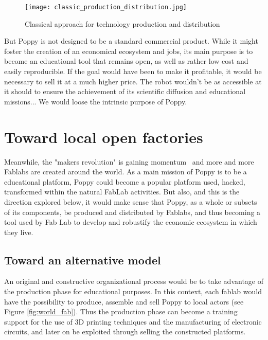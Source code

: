 \begin{figure}[h]
    \begin{center}
        \texttt{[image: classic\_production\_distribution.jpg]}
    \end{center}
    \caption{Classical approach for technology production and distribution}
    \label{fig:classic}
\end{figure}


But Poppy is not designed to be a standard commercial product. While it might foster the creation of an economical ecosystem and jobs, its main purpose is to become an educational tool that remains open, as well as rather low cost and easily reproducible. If the goal would have been to make it profitable, it would be necessary to sell it at a much higher price. The robot wouldn't be as accessible at it should to ensure the achievement of its scientific diffusion and educational missions... We would loose the intrinsic purpose of Poppy.

\section{Toward local open factories } %

Meanwhile, the "makers revolution" is gaining momentum~\cite{anderson2012makers} and more and more Fablabs are created around the world. As a main mission of Poppy is to be a educational platform, Poppy could become a popular platform used, hacked, transformed within the natural FabLab activities. But also, and this is the direction explored below,  it would make sense that Poppy, as a whole or subsets of its components, be produced and distributed by Fablabs, and thus becoming a tool used by Fab Lab to develop and robustify the economic ecosystem in which they live.

\subsection{Toward an alternative model} %

An original and constructive organizational process would be to take advantage of the production phase for educational purposes. In this context, each fablab would have the possibility to produce, assemble and sell Poppy to local actors (see Figure \ref{fig:world_fab}). Thus the production phase can become a training support for the use of 3D printing techniques and the manufacturing of electronic circuits, and later on be exploited through selling the constructed platforms.


